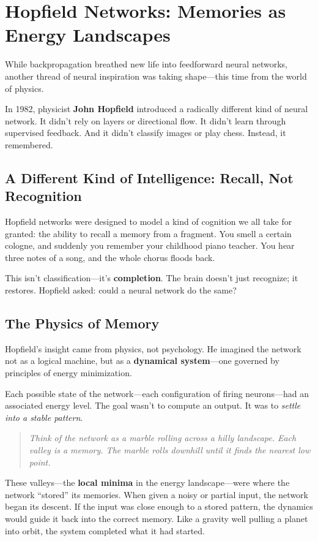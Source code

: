 \section{Hopfield Networks: Memories as Energy Landscapes}

While backpropagation breathed new life into feedforward neural networks, another thread of neural inspiration was taking shape—this time from the world of physics.

In 1982, physicist \textbf{John Hopfield} introduced a radically different kind of neural network. It didn’t rely on layers or directional flow. It didn’t learn through supervised feedback. And it didn’t classify images or play chess. Instead, it remembered.

\subsection*{A Different Kind of Intelligence: Recall, Not Recognition}

Hopfield networks were designed to model a kind of cognition we all take for granted: the ability to recall a memory from a fragment. You smell a certain cologne, and suddenly you remember your childhood piano teacher. You hear three notes of a song, and the whole chorus floods back.

This isn’t classification—it’s \textbf{completion}. The brain doesn't just recognize; it restores. Hopfield asked: could a neural network do the same?

\subsection{The Physics of Memory}

Hopfield’s insight came from physics, not psychology. He imagined the network not as a logical machine, but as a \textbf{dynamical system}—one governed by principles of energy minimization.

Each possible state of the network—each configuration of firing neurons—had an associated energy level. The goal wasn’t to compute an output. It was to \emph{settle into a stable pattern}.

\begin{quote}
\textit{Think of the network as a marble rolling across a hilly landscape. Each valley is a memory. The marble rolls downhill until it finds the nearest low point.}
\end{quote}

These valleys—the \textbf{local minima} in the energy landscape—were where the network “stored” its memories. When given a noisy or partial input, the network began its descent. If the input was close enough to a stored pattern, the dynamics would guide it back into the correct memory. Like a gravity well pulling a planet into orbit, the system completed what it had started.

